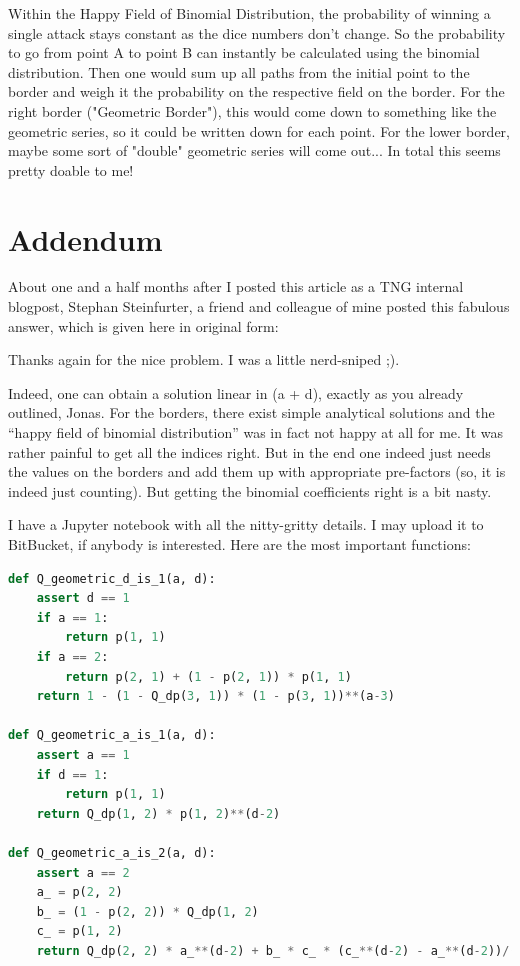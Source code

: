 \documentclass[11pt,a4paper]{article}
\begin{document}
    Within the Happy Field of Binomial Distribution, the probability of winning a single attack stays constant as the dice numbers don't change.
    So the probability to go from point A to point B can instantly be calculated using the binomial distribution.
    Then one would sum up all paths from the initial point to the border and weigh it the probability on the respective field on the border.
    For the right border ("Geometric Border"), this would come down to something like the geometric series, so it could be written down for each point.
    For the lower border, maybe some sort of "double" geometric series will come out... In total this seems pretty doable to me!


    \section{Addendum}
    About one and a half months after I posted this article as a TNG internal blogpost, Stephan Steinfurter, a friend and colleague of mine posted this fabulous answer, which is given here in original form:

    \vspace{\baselineskip}

    Thanks again for the nice problem.
    I was a little nerd-sniped ;).

    Indeed, one can obtain a solution linear in (a + d), exactly as you already outlined, Jonas.
    For the borders, there exist simple analytical solutions and the ``happy field of binomial distribution'' was in fact not happy at all for me.
    It was rather painful to get all the indices right.
    But in the end one indeed just needs the values on the borders and add them up with appropriate pre-factors (so, it is indeed just counting).
    But getting the binomial coefficients right is a bit nasty.

    I have a Jupyter notebook with all the nitty-gritty details.
    I may upload it to BitBucket, if anybody is interested.
    Here are the most important functions:

    \begin{lstlisting}[language=Python]
def Q_geometric_d_is_1(a, d):
    assert d == 1
    if a == 1:
        return p(1, 1)
    if a == 2:
        return p(2, 1) + (1 - p(2, 1)) * p(1, 1)
    return 1 - (1 - Q_dp(3, 1)) * (1 - p(3, 1))**(a-3)

def Q_geometric_a_is_1(a, d):
    assert a == 1
    if d == 1:
        return p(1, 1)
    return Q_dp(1, 2) * p(1, 2)**(d-2)

def Q_geometric_a_is_2(a, d):
    assert a == 2
    a_ = p(2, 2)
    b_ = (1 - p(2, 2)) * Q_dp(1, 2)
    c_ = p(1, 2)
    return Q_dp(2, 2) * a_**(d-2) + b_ * c_ * (c_**(d-2) - a_**(d-2))/(c_ - a_)
    \end{lstlisting}
\end{document}
